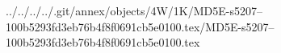 ../../../../.git/annex/objects/4W/1K/MD5E-s5207--100b5293fd3eb76b4f8f0691cb5e0100.tex/MD5E-s5207--100b5293fd3eb76b4f8f0691cb5e0100.tex